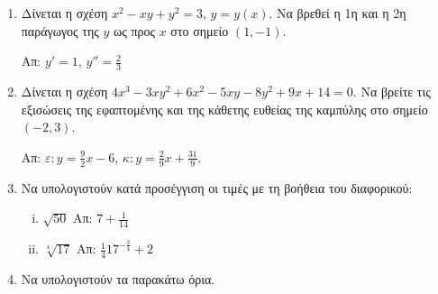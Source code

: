 \begin{enumerate}


\item Δίνεται η σχέση $ x^{2} - xy + y^{2} = 3 $, $ y=y(x) $. Να βρεθεί η 1η
  και η 2η παράγωγος της $y$ ως προς $x$ στο σημείο $ (1,-1) $.

  \hfill Απ: $ y' = 1$, $ y'' = \frac{2}{3} $

\item Δίνεται η σχέση $ 4x^{3} - 3xy^{2} + 6x^{2} - 5xy - 8 y^{2} + 9x + 14
  = 0$. Να βρείτε τις εξισώσεις της εφαπτομένης και της κάθετης ευθείας
  της καμπύλης στο σημείο $ (-2,3) $.

  \hfill Απ: $\varepsilon\colon y = \frac{9}{2} x - 6 $, 
  $\kappa\colon y = \frac{2}{9} x + \frac{31}{9} $.

\item Να υπολογιστούν κατά προσέγγιση οι τιμές με τη βοήθεια του διαφορικού:
  \begin{enumerate}[i)]
    \item $\sqrt{50}$ \hfill Απ: $7+\frac{1}{14}$
    \item $\sqrt[4]{17}$ \hfill Απ: $\frac{1}{4}17^{-\frac{3}{4}}+2$
  \end{enumerate}

\item Να υπολογιστούν τα παρακάτω όρια.
  \begin{enumerate}[(i)]
\end{enumerate}


\end{enumerate}
